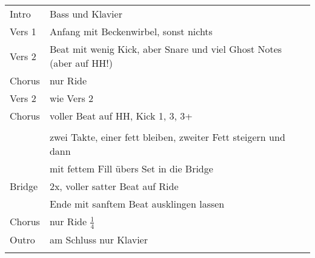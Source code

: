 
\begin{tabular}{ll}
	Intro  & Bass und Klavier \\
	Vers 1 & Anfang mit Beckenwirbel, sonst nichts \\
	Vers 2 & Beat mit wenig Kick, aber Snare und viel Ghost Notes (aber auf HH!) \\
	Chorus & nur Ride \\
	Vers 2 & wie Vers 2 \\
	Chorus & voller Beat auf HH, Kick 1, 3, 3+ \\
	       &  \\
	       & zwei Takte, einer fett bleiben, zweiter Fett steigern und dann \\
	       & mit fettem Fill übers Set in die Bridge \\
	Bridge & 2x, voller satter Beat auf Ride \\
	       & Ende mit sanftem Beat ausklingen lassen \\
	Chorus & nur Ride $\frac{1}{4}$ \\
	Outro  & am Schluss nur Klavier \\
	& \\
\end{tabular}